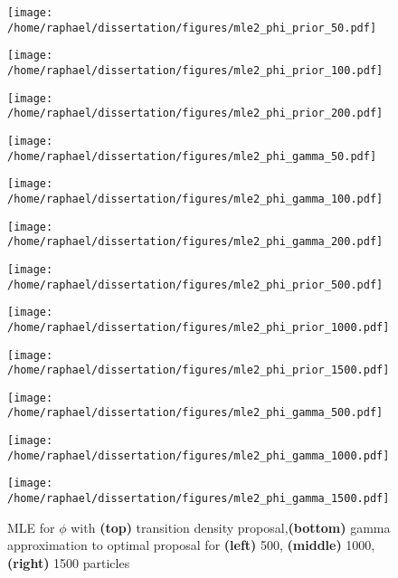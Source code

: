 \documentclass{article}
\begin{document}
	\begin{figure}[htb]
	\centering
	\begin{minipage}{0.3\textwidth}
		\centering
		\texttt{[image: /home/raphael/dissertation/figures/mle2\_phi\_prior\_50.pdf]}
	\end{minipage}
	\begin{minipage}{.3\textwidth}
		\centering
		\texttt{[image: /home/raphael/dissertation/figures/mle2\_phi\_prior\_100.pdf]}
	\end{minipage}
	\begin{minipage}{0.3\textwidth}
		\centering
		\texttt{[image: /home/raphael/dissertation/figures/mle2\_phi\_prior\_200.pdf]}
	\end{minipage}
	\begin{minipage}{0.3\textwidth}
		\centering
		\texttt{[image: /home/raphael/dissertation/figures/mle2\_phi\_gamma\_50.pdf]}
	\end{minipage}
	\begin{minipage}{.3\textwidth}
		\centering
		\texttt{[image: /home/raphael/dissertation/figures/mle2\_phi\_gamma\_100.pdf]}
	\end{minipage}
	\begin{minipage}{.3\textwidth}
		\centering
		\texttt{[image: /home/raphael/dissertation/figures/mle2\_phi\_gamma\_200.pdf]}
	\end{minipage}
	
	\begin{minipage}{0.3\textwidth}
		\centering
		\texttt{[image: /home/raphael/dissertation/figures/mle2\_phi\_prior\_500.pdf]}
	\end{minipage}
	\begin{minipage}{.3\textwidth}
		\centering
		\texttt{[image: /home/raphael/dissertation/figures/mle2\_phi\_prior\_1000.pdf]}
	\end{minipage}
	\begin{minipage}{.3\textwidth}
		\centering
		\texttt{[image: /home/raphael/dissertation/figures/mle2\_phi\_prior\_1500.pdf]}
	\end{minipage}
	\begin{minipage}{.3\textwidth}
		\centering
		\texttt{[image: /home/raphael/dissertation/figures/mle2\_phi\_gamma\_500.pdf]}
	\end{minipage}
	\begin{minipage}{.3\textwidth}
		\centering
		\texttt{[image: /home/raphael/dissertation/figures/mle2\_phi\_gamma\_1000.pdf]}
	\end{minipage}
	\begin{minipage}{.3\textwidth}
		\centering
		\texttt{[image: /home/raphael/dissertation/figures/mle2\_phi\_gamma\_1500.pdf]}
	\end{minipage}
	\caption{MLE for $\phi$ with \textbf{(top)} transition density proposal,\textbf{(bottom)} gamma approximation to optimal proposal for \textbf{(left)} 500, \textbf{(middle)} 1000, \textbf{(right)} 1500 particles}
	\label{fig:comparisonphi}
\end{figure}
	
\end{document}
